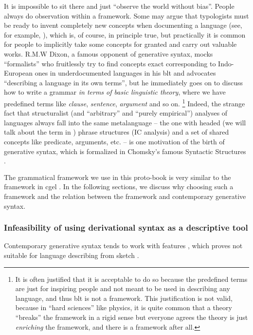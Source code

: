 \documentclass[../main.tex]{subfiles}
\begin{document}
It is impossible to sit there and just ``observe the world without bias''. People always do observation within a 
framework. Some may argue that typologists must be ready to invent completely new concepts when documenting 
a language (see, for example, \citet{haspelmath2008framework}), which is, of course, in principle true, 
but practically it is common for people to implicitly take some concepts for granted and carry out 
valuable works. R.M.W Dixon, a famous opponent of generative syntax, mocks ``formalists'' who fruitlessly try 
to find concepts exact corresponding to Indo-European ones in underdocumented languages in his 
\ac{blt} \citep{dixon2009basic} and advocates ``describing a language in its own terms'',
but he immediately goes on to discuss how to write a grammar \emph{in terms of basic linguistic theory},
where we have predefined terms like \emph{clause}, \emph{sentence}, \emph{argument} and so on. %
\footnote{
    It is often justified that it is acceptable to do so because the predefined terms are just for inspiring 
    people and not meant to be used in describing any language, and thus \ac{blt} is not a framework. This justification is not valid, because in 
    ``hard sciences'' like physics, it is quite common that a theory ``breaks'' the framework in a rigid sense 
    but everyone agrees the theory is just \emph{enriching} the framework, and there is a framework after all.
}%
Indeed, the strange fact that structuralist (and ``arbitrary'' and ``purely empirical'') analyses of 
languages always fall into the same metalanguage -- the one with headed (we will talk about the term in 
) phrase structures (IC analysis) and a set of shared concepts like predicate, 
arguments, etc. -- is one motivation of the birth of generative syntax, which is formalized in Chomsky's 
famous Syntactic Structures \citep{chomsky2009syntactic}.

The grammatical framework we use in this proto-book is very similar to the framework in \ac{cgel} \citep{cgel,pullum2008expressive}. In the following sections, we discuss why choosing such a framework and the relation 
between the framework and contemporary generative syntax.

\subsubsection{Infeasibility of using derivational syntax as a descriptive tool}

Contemporary generative syntax tends to work with features , which proves not suitable for language describing from sketch \citep{dryer2006descriptive}.
\end{document}
